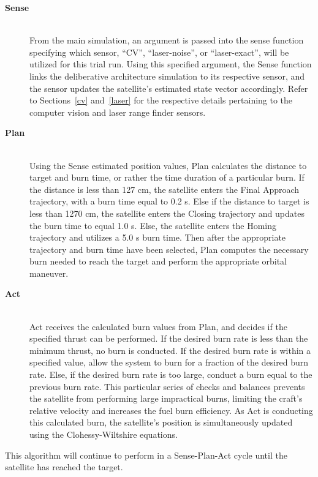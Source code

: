 \documentclass[journal, 10pt]{IEEEtran}
\begin{document}
\begin{description}
\item[\textbf{Sense}] \hfill \\
From the main simulation, an argument is passed into the sense function specifying which sensor, ``CV'', ``laser-noise'', or ``laser-exact'', will be utilized for this trial run. Using this specified argument, the Sense function links the deliberative architecture simulation to its respective sensor, and the sensor updates the satellite's estimated state vector accordingly. Refer to Sections~\ref{cv} and~\ref{laser} for the respective details pertaining to the computer vision and laser range finder sensors.

\item[\textbf{Plan}] \hfill \\
Using the Sense estimated position values, Plan calculates the distance to target and burn time, or rather the time duration of a particular burn. If the distance is less than 127 cm, the satellite enters the Final Approach trajectory, with a burn time equal to 0.2 s. Else if the distance to target is less than 1270 cm, the satellite enters the Closing trajectory and updates the burn time to equal 1.0 s. Else, the satellite enters the Homing trajectory and utilizes a 5.0 s burn time. Then after the appropriate trajectory and burn time have been selected, Plan computes the necessary burn needed to reach the target and perform the appropriate orbital maneuver.

\item[\textbf{Act}] \hfill \\
Act receives the calculated burn values from Plan, and decides if the specified thrust can be performed. If the desired burn rate is less than the minimum thrust, no burn is conducted. If the desired burn rate is within a specified value, allow the system to burn for a fraction of the desired burn rate. Else, if the desired burn rate is too large, conduct a burn equal to the previous burn rate. This particular series of checks and balances prevents the satellite from performing large impractical burns, limiting the craft's relative velocity and increases the fuel burn efficiency. As Act is conducting this calculated burn, the satellite's position is simultaneously updated using the Clohessy-Wiltshire equations.
\end{description}

This algorithm will continue to perform in a Sense-Plan-Act cycle until the satellite has reached the target.
\end{document}

